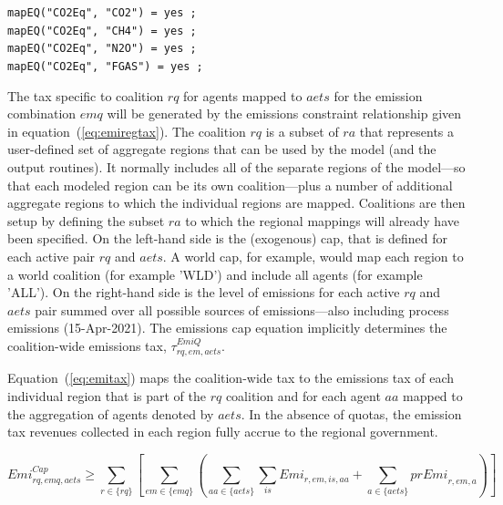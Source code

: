 \documentclass[11pt,letterpaper]{report}
\begin{document}
\medskip
\texttt{mapEQ("CO2Eq", "CO2") = yes ;} \\
\texttt{mapEQ("CO2Eq", "CH4") = yes ;} \\
\texttt{mapEQ("CO2Eq", "N2O") = yes ;} \\
\texttt{mapEQ("CO2Eq", "FGAS") = yes ;} \\
\medskip

The tax specific to coalition $\mathit{rq}$ for agents
mapped to $\mathit{aets}$ for the emission combination $\mathit{emq}$ will be generated by the emissions
constraint relationship given in equation~(\ref{eq:emiregtax}).
The coalition $\mathit{rq}$ is
a subset of $\mathit{ra}$ that represents a user-defined set of aggregate
regions that can be used by the model (and the output routines). It normally
includes all of the separate regions of the model---so that each modeled region
can be its own coalition---plus a number of additional aggregate regions to
which the individual regions are mapped. Coalitions are then setup by
defining the subset $\mathit{ra}$ to which the regional mappings will already
have been specified.
On the left-hand side is the (exogenous) cap, that is defined for each
active pair $\mathit{rq}$ and $\mathit{aets}$. A world cap, for example,
would map each region to a world coalition (for example 'WLD') and
include all agents (for example 'ALL'). On the right-hand side
is the level of emissions for each active $\mathit{rq}$ and $\mathit{aets}$
pair summed over all possible sources of emissions---also
including process emissions (15-Apr-2021).
The emissions cap equation implicitly determines the
coalition-wide emissions tax, $\tau^{\mathit{EmiQ}}_{\mathit{rq},\mathit{em},\mathit{aets}}$.

Equation~(\ref{eq:emitax}) maps the coalition-wide tax to the
emissions tax of each individual region that is part of the $\mathit{rq}$
coalition and for each agent $\mathit{aa}$ mapped to the
aggregation of agents denoted by $\mathit{aets}$. In the absence of quotas, the emission tax revenues
collected in each region fully accrue to the regional government.

\begin{equation}
\label{eq:emiregtax}
\mathit{Emi}^{\mathit{Cap}}_{\mathit{rq},\mathit{emq},\mathit{aets}}
\ge
\sum_{r \in \{ \mathit{rq}\}}
{\left[
\sum_{\mathit{em} \in \{\mathit{emq}\}}
\left( \sum_{\mathit{aa} \in \{\mathit{aets}\}}
\sum_{\mathit{is}} {\mathit{Emi}_{r,\mathit{em},\mathit{is},\mathit{aa}}}
 +
\sum_{\mathit{a} \in \{\mathit{aets}\}}{\mathit{prEmi}_{r,\mathit{em},a}}
\right)
\right]}
\end{equation}
\end{document}
